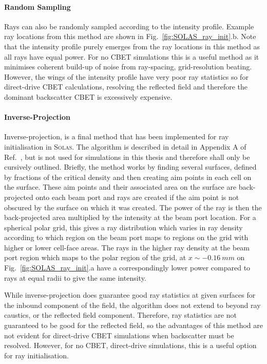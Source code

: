\paragraph*{Random Sampling}
Rays can also be randomly sampled according to the intensity profile.
Example ray locations from this method are shown in Fig.~\ref{fig:SOLAS_ray_init}.b.
Note that the intensity profile purely emerges from the ray locations in this method as all rays have equal power.
For no \ac{CBET} simulations this is a useful method as it minimises coherent build-up of noise from ray-spacing, grid-resolution beating.
However, the wings of the intensity profile have very poor ray statistics so for direct-drive \ac{CBET} calculations, resolving the reflected field and therefore the dominant backscatter \ac{CBET} is excessively expensive.

\paragraph*{Inverse-Projection}
Inverse-projection, is a final method that has been implemented for ray initialisation in \textsc{Solas}.
The algorithm is described in detail in Appendix A of Ref.~\cite{marozas_wavelength-detuning_2018}, but is not used for simulations in this thesis and therefore shall only be cursively outlined.
Briefly, the method works by finding several surfaces, defined by fractions of the critical density and then creating aim points in each cell on the surface.
These aim points and their associated area on the surface are back-projected onto each beam port and rays are created if the aim point is not obscured by the surface on which it was created.
The power of the ray is then the back-projected area multiplied by the intensity at the beam port location.
For a spherical polar grid, this gives a ray distribution which varies in ray density according to which region on the beam port maps to regions on the grid with higher or lower cell-face areas.
The rays in the higher ray density at the beam port region which maps to the polar region of the grid, at $x\sim -0.16\ mm$ on Fig.~\ref{fig:SOLAS_ray_init}.a have a correspondingly lower power compared to rays at equal radii to give the same intensity.

While inverse-projection does guarantee good ray statistics at given surfaces for the inbound component of the field, the algorithm does not extend to beyond ray caustics, or the reflected field component.
Therefore, ray statistics are not guaranteed to be good for the reflected field, so the advantages of this method are not evident for direct-drive \ac{CBET} simulations when backscatter must be resolved.
However, for no \ac{CBET}, direct-drive simulations, this is a useful option for ray initialisation.

